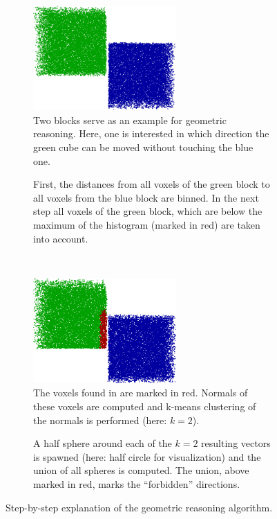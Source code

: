 \begin{figure}[]
  \begin{subfigure}[]{0.4\textwidth}
    \centering
    \includegraphics[height=4cm]{./figures/sec/geometrical_reasoning/blocks.png}
    \caption{Two blocks serve as an example for geometric reasoning. Here, one is interested in which direction the green cube can be moved without touching the blue one.}
    \label{fig:sec_enriched_geometricalreasoning_approach_overview_blocks}
  \end{subfigure}
  \hfill
  \begin{subfigure}[]{0.55\textwidth}
    \centering
    
    \caption{First, the distances from all voxels of the green block to all voxels from the blue block are binned. In the next step all voxels of the green block, which are below the maximum of the histogram (marked in red) are taken into account.}
    \label{fig:sec_enriched_geometricalreasoning_approach_overview_histogram}
  \end{subfigure}\\
  \begin{subfigure}[]{0.4\textwidth}
    \centering
    \includegraphics[height=4cm]{./figures/sec/geometrical_reasoning/blocks_marked.png}
    \caption{The voxels found in  are marked in red. Normals of these voxels are computed and k-means clustering of the normals is performed (here: $k=2$).}
    \label{fig:sec_enriched_geometricalreasoning_approach_overview_blocksmarked}
  \end{subfigure}
  \hfill
  \begin{subfigure}[]{0.55\textwidth}
    \centering
    
    \caption{A half sphere around each of the $k=2$ resulting vectors is spawned (here: half circle for visualization) and the union of all spheres is computed. The union, above marked in red, marks the ``forbidden'' directions.}
    \label{fig:sec_enriched_geometricalreasoning_approach_overview_clusterdirections}
  \end{subfigure}
  \caption{Step-by-step explanation of the geometric reasoning algorithm.}
  \label{fig:sec_enriched_geometricalreasoning_approach_overview}
\end{figure}

